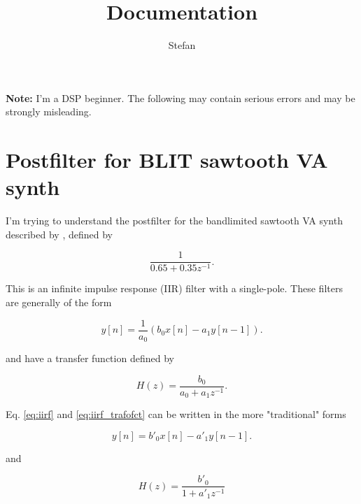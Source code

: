 \documentclass[12pt,a4paper]{article}
\title{Documentation}
\author{Stefan}
\begin{document}
\setlength{\parindent}{0cm}
\maketitle


{\bf Note:} I'm a DSP beginner. The following may contain serious errors and may be strongly misleading.

\section{Postfilter for BLIT sawtooth VA synth}\label{sec:dsp}

 I'm trying to understand the postfilter for the bandlimited sawtooth VA synth described by 
\cite[][his page 17]{frei2002digital}, defined by

\begin{equation}\label{eq:freifilter}
    \frac{1}{0.65+0.35z^{-1}}.
\end{equation}

This is an infinite impulse response (IIR) filter with a single-pole. These filters are generally of the form \citep{wiki:IIR}

\begin{equation}\label{eq:iirf}
y[n]=\frac{1}{a_0} (b_0x[n]-a_1y[n-1]).
\end{equation}

and have a transfer function defined by

\begin{equation}\label{eq:iirf_trafofct}
H(z)=\frac{b_0}{a_0+a_1z^{-1}}.
\end{equation}

Eq. \ref{eq:iirf} and \eqref{eq:iirf_trafofct} can be written in the more "traditional" \citep{wiki:IIR} forms

\begin{equation}\label{eq:iirf_normal}
y[n]=b'_0x[n]-a'_1y[n-1].
\end{equation}

and

\begin{equation}\label{eq:iirf_trafofct_normal}
H(z)=\frac{b'_0}{1+a'_1z^{-1}}
\end{equation}
\end{document}
